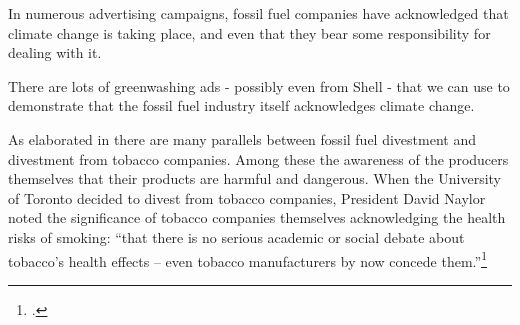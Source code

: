 In numerous advertising campaigns, fossil fuel companies have acknowledged that climate change is taking place, and even that they bear some responsibility for dealing with it.



\begin{vcom}
There are lots of greenwashing ads - possibly even from Shell - that we can use to demonstrate that the fossil fuel industry itself acknowledges climate change.
\end{vcom}



As elaborated in  there are many parallels between fossil fuel divestment and divestment from tobacco companies.
Among these the awareness of the producers themselves that their products are harmful and dangerous.
When the University of Toronto decided to divest from tobacco companies, President David Naylor noted the significance of tobacco companies themselves acknowledging the health risks of smoking: ``that there is no serious academic or social debate about tobacco's health effects – even tobacco manufacturers by now concede them.''\footcite[][]{TStarSellOff}



